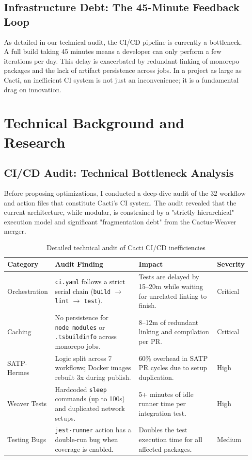 \subsection{Infrastructure Debt: The 45-Minute Feedback Loop}
As detailed in our technical audit, the CI/CD pipeline is currently a bottleneck. A full build taking 45 minutes means a developer can only perform a few iterations per day. This delay is exacerbated by redundant linking of monorepo packages and the lack of artifact persistence across jobs. In a project as large as Cacti, an inefficient CI system is not just an inconvenience; it is a fundamental drag on innovation.

\section{Technical Background and Research}

\subsection{CI/CD Audit: Technical Bottleneck Analysis}

Before proposing optimizations, I conducted a deep-dive audit of the 32 workflow and action files that constitute Cacti's CI system. The audit revealed that the current architecture, while modular, is constrained by a "strictly hierarchical" execution model and significant "fragmentation debt" from the Cactus-Weaver merger.

\begin{table}[h]
\centering
\begin{tabularx}{\textwidth}{p{3.2cm} X X p{1.6cm}}
\toprule
\textbf{\color{primary} Category} & \textbf{\color{primary} Audit Finding} & \textbf{\color{primary} Impact} & \textbf{\color{primary} Severity} \\
\midrule
Orchestration & \texttt{ci.yaml} follows a strict serial chain (\texttt{build} $\rightarrow$ \texttt{lint} $\rightarrow$ \texttt{test}). & Tests are delayed by 15--20m while waiting for unrelated linting to finish. & Critical \\
\addlinespace
Caching & No persistence for \texttt{node\_modules} or \texttt{.tsbuildinfo} across monorepo jobs. & 8--12m of redundant linking and compilation per PR. & Critical \\
\addlinespace
SATP-Hermes & Logic split across 7 workflows; Docker images rebuilt 3x during publish. & 60\% overhead in SATP PR cycles due to setup duplication. & High \\
\addlinespace
Weaver Tests & Hardcoded \texttt{sleep} commands (up to 100s) and duplicated network setups. & 5+ minutes of idle runner time per integration test. & High \\
\addlinespace
Testing Bugs & \texttt{jest-runner} action has a double-run bug when coverage is enabled. & Doubles the test execution time for all affected packages. & Medium \\
\bottomrule
\end{tabularx}
\caption{Detailed technical audit of Cacti CI/CD inefficiencies}
\label{tab:cicd-audit-detailed}
\end{table}

